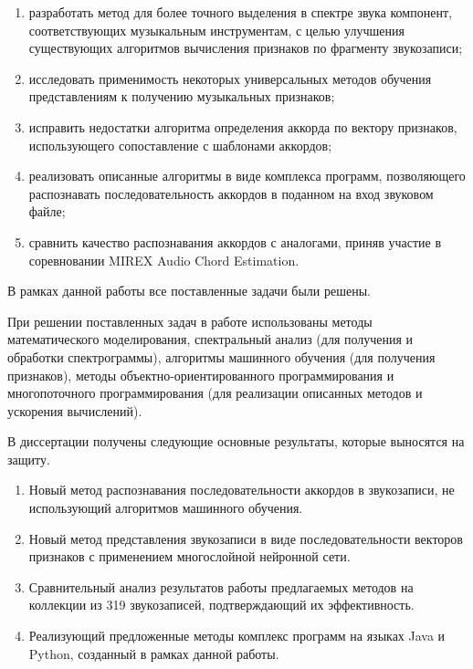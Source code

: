 \begin{enumerate}
  \item \label{task1} разработать метод для более точного выделения в спектре
  звука компонент, соответствующих музыкальным инструментам, с целью улучшения
  существующих алгоритмов вычисления признаков по фрагменту звукозаписи;
  \item \label{task2} исследовать применимость некоторых универсальных методов
  обучения представлениям к получению музыкальных признаков;
  \item \label{task3} исправить недостатки алгоритма определения аккорда по
  вектору признаков, использующего сопоставление с шаблонами аккордов;
  \item \label{task4} реализовать описанные алгоритмы в виде комплекса программ,
  позволяющего распознавать последовательность аккордов в поданном на вход
  звуковом файле;
  \item \label{task5} сравнить качество распознавания аккордов с аналогами,
  приняв участие в соревновании MIREX Audio Chord Estimation.
\end{enumerate}

В рамках данной работы все поставленные задачи были решены.

При решении поставленных задач в работе использованы методы математического
моделирования, спектральный анализ (для получения и обработки спектрограммы),
алгоритмы машинного обучения (для получения признаков), методы
объектно-ориентированного программирования и многопоточного программирования
(для реализации описанных методов и ускорения вычислений).

В диссертации получены следующие основные результаты, которые выносятся на
защиту.

\begin{enumerate}
  \item Новый метод распознавания последовательности аккордов в звукозаписи, не
  использующий алгоритмов машинного обучения.
  \item Новый метод представления звукозаписи в виде последовательности векторов
  признаков с применением многослойной нейронной сети.
  \item Сравнительный анализ результатов работы предлагаемых методов на
  коллекции из 319 звукозаписей, подтверждающий их эффективность.
  \item Реализующий предложенные методы комплекс программ на языках Java и
  Python, созданный в рамках данной работы.
\end{enumerate}

